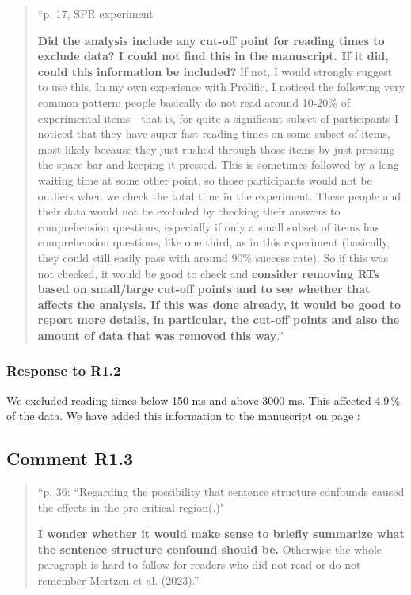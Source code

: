 \documentclass[12pt]{article}
\begin{document}
\begin{quote}
``p. 17, SPR experiment

\textbf{Did the analysis include any cut-off point for reading times to exclude data? I could not find this in the manuscript. If it did, could this information be included?} If not, I would strongly suggest to use this. In my own experience with Prolific, I noticed the following very common pattern: people basically do not read around 10-20\% of experimental items - that is, for quite a significant subset of participants I noticed that they have super fast reading times on some subset of items, most likely because they just rushed through those items by just pressing the space bar and keeping it pressed. This is sometimes followed by a long waiting time at some other point, so those participants would not be outliers when we check the total time in the experiment. These people and their data would not be excluded by checking their answers to comprehension questions, especially if only a small subset of items has comprehension questions, like one third, as in this experiment (basically, they could still easily pass with around 90\% success rate). So if this was not checked, it would be good to check and \textbf{consider removing RTs based on small/large cut-off points and to see whether that affects the analysis. If this was done already, it would be good to report more details, in particular, the cut-off points and also the amount of data that was removed this way}.''
\end{quote}

\subsubsection*{Response to R1.2}
We excluded reading times below 150 ms and above 3000 ms. This affected 4.9\,\% of the data. We have added this information to the manuscript on page \pageref{trim}:

\begin{quote}
\end{quote}

\subsection*{Comment R1.3}
\begin{quote}
``p. 36: ``Regarding the possibility that sentence structure confounds caused the effects in the pre-critical region(.)"

\textbf{I wonder whether it would make sense to briefly summarize what the sentence structure confound should be.} Otherwise the whole paragraph is hard to follow for readers who did not read or do not remember Mertzen et al. (2023).''
\end{quote}
\end{document}
